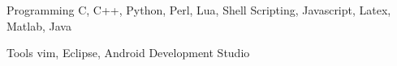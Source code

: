 \begin{cvskills}
  \cvskill
    {Programming}
    {C, C++, Python, Perl, Lua, Shell Scripting, Javascript, Latex, Matlab, Java}

  \cvskill
    {Tools}
    {vim, Eclipse, Android Development Studio}
\end{cvskills}
